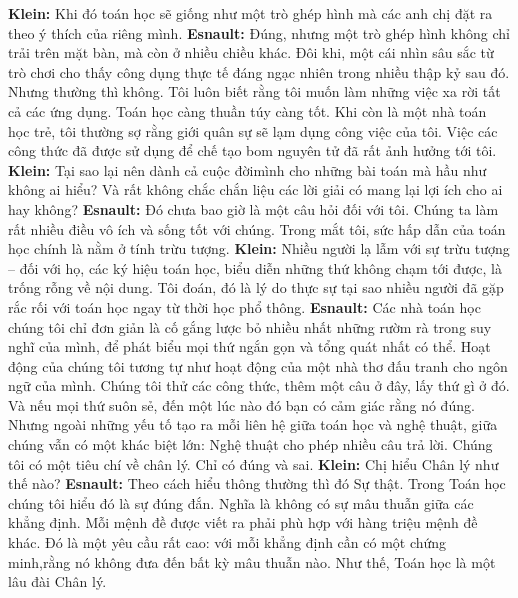 \begin{multicols}{2}
	\vskip 0.1cm
	\textbf{\color{doithoaitoanhoc}Klein:} Khi đó toán học sẽ giống như một trò ghép hình mà các anh chị đặt ra theo ý thích của riêng mình.
	\vskip 0.1cm
	\textbf{\color{doithoaitoanhoc}Esnault:} Đúng, nhưng một trò ghép hình không chỉ trải trên mặt bàn, mà còn ở nhiều chiều khác. Đôi khi, một cái nhìn sâu sắc từ trò chơi cho thấy công dụng thực tế đáng ngạc nhiên trong nhiều thập kỷ sau đó. Nhưng thường thì không. Tôi luôn biết rằng tôi muốn làm những việc xa rời tất cả các ứng dụng. Toán học càng thuần túy càng tốt. Khi còn là một nhà toán học trẻ, tôi thường sợ rằng giới quân sự sẽ lạm dụng công việc của tôi. Việc các công thức đã được sử dụng để chế tạo bom nguyên tử đã rất ảnh hưởng tới tôi.
	\vskip 0.1cm
	\textbf{\color{doithoaitoanhoc}Klein:} Tại sao lại nên dành cả cuộc đời\linebreak mình cho những bài toán mà hầu như không ai hiểu? Và rất không chắc chắn liệu các lời giải có mang lại lợi ích cho ai hay không?
	\vskip 0.1cm
	\textbf{\color{doithoaitoanhoc}Esnault:} Đó chưa bao giờ là một câu hỏi đối với tôi. Chúng ta làm rất nhiều điều vô ích và sống tốt với chúng. Trong mắt tôi, sức hấp dẫn của toán học chính là nằm ở tính trừu tượng.
	\vskip 0.1cm
	\textbf{\color{doithoaitoanhoc}Klein:} Nhiều người lạ lẫm với sự trừu tượng -- đối với họ, các ký hiệu toán học, biểu diễn những thứ không chạm tới được, là trống rỗng về nội dung. Tôi đoán, đó là lý do thực sự tại sao nhiều người đã gặp rắc rối với toán học ngay từ thời học phổ thông.  
	\vskip 0.1cm
	\textbf{\color{doithoaitoanhoc}Esnault:} Các nhà toán học chúng tôi chỉ đơn giản là cố gắng lược bỏ nhiều nhất những rườm rà trong suy nghĩ của mình, để phát biểu mọi thứ ngắn gọn và tổng quát nhất có thể. Hoạt động của chúng tôi tương tự như hoạt động của một nhà thơ đấu tranh cho ngôn ngữ của mình. Chúng tôi thử các công thức, thêm một câu ở đây, lấy thứ gì ở đó. Và nếu mọi thứ suôn sẻ, đến một lúc nào đó bạn có cảm giác rằng nó đúng. Nhưng ngoài những yếu tố tạo ra mỗi liên hệ giữa toán học và nghệ thuật, giữa chúng vẫn có một khác biệt lớn: Nghệ thuật cho phép nhiều câu trả lời. Chúng tôi có một tiêu chí về chân lý. Chỉ có đúng và sai.
	\vskip 0.1cm
	\textbf{\color{doithoaitoanhoc}Klein:} Chị hiểu Chân lý như thế nào?
	\vskip 0.1cm
	\textbf{\color{doithoaitoanhoc}Esnault:} Theo cách hiểu thông thường thì đó Sự thật. Trong Toán học chúng tôi hiểu đó là sự đúng đắn. Nghĩa là không có sự mâu thuẫn giữa các khẳng định. Mỗi mệnh đề được viết ra phải phù hợp với hàng triệu \linebreak mệnh đề khác. Đó là một yêu cầu rất cao: với mỗi khẳng định cần có một chứng minh,\linebreak rằng nó không đưa đến bất kỳ mâu thuẫn nào. Như thế, Toán học là một lâu đài Chân lý.

\end{multicols}

